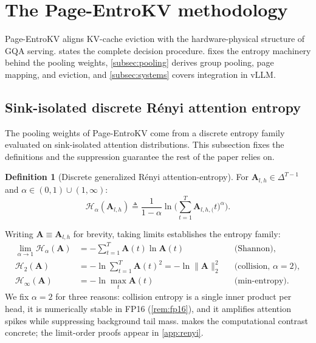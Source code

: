 \documentclass[final,5p,times,twocolumn]{elsarticle}
\theoremstyle{definition}
\newtheorem{definition}{Definition}
\theoremstyle{remark}
\newcommand{\method}{Page-EntroKV}
\newcommand{\Attn}[2]{\mathbf{A}_{#1,#2}}
\newcommand{\Renyi}[2]{\mathcal{H}_{#1}\!\left(#2\right)}
\newcommand{\Collision}[1]{\mathcal{H}_{2}\!\left(#1\right)}
\begin{document}
\section{The \method{} methodology}
\label{sec:methodology}

\method{} aligns KV-cache eviction with the hardware-physical structure
of GQA serving.  states the complete decision
procedure.  fixes the entropy machinery behind the
pooling weights, \cref{subsec:pooling} derives group pooling, page
mapping, and eviction, and \cref{subsec:systems} covers integration in
vLLM.

\subsection{Sink-isolated discrete R\'enyi attention entropy}
\label{subsec:entropy}

The pooling weights of \method{} come from a discrete entropy family
evaluated on sink-isolated attention distributions. This subsection
fixes the definitions and the suppression guarantee the rest of the
paper relies on.

\begin{definition}[Discrete generalized R\'enyi attention-entropy]
\label{def:renyi}
For $\Attn{l}{h} \in \Delta^{T-1}$ and
 $\alpha \in (0,1) \cup (1,\infty)$:
\begin{equation}
\Renyi{\alpha}{\Attn{l}{h}}
\triangleq \frac{1}{1-\alpha}
\ln \Biggl( \sum_{t=1}^T \Attn{l,h}(t)^{\alpha} \Biggr).
\label{eq:renyi_def}
\end{equation}
\end{definition}

Writing $\mathbf{A}\equiv\Attn{l}{h}$ for brevity, taking limits
establishes the entropy family:
\begin{align}
\lim_{\alpha \to 1} \Renyi{\alpha}{\mathbf{A}}
&= -\sum_{t=1}^T \mathbf{A}(t) \ln \mathbf{A}(t)
&& \text{(Shannon)}, \label{eq:shannon_limit} \\
\Collision{\mathbf{A}}
&= -\ln \sum_{t=1}^T \mathbf{A}(t)^2
 = -\ln \|\mathbf{A}\|_2^2
&& \text{(collision, } \alpha{=}2\text{)}, \label{eq:collision_entropy} \\
\mathcal{H}_{\infty}(\mathbf{A})
&= -\ln \max_t \mathbf{A}(t)
&& \text{(min-entropy)}. \label{eq:min_entropy}
\end{align}
We fix $\alpha=2$ for three reasons: collision entropy is a single inner
product per head, it is numerically stable in FP16 (\cref{rem:fp16}),
and it amplifies attention spikes while suppressing background tail
mass.  makes the computational contrast
concrete; the limit-order proofs appear in \cref{app:renyi}.
\end{document}

